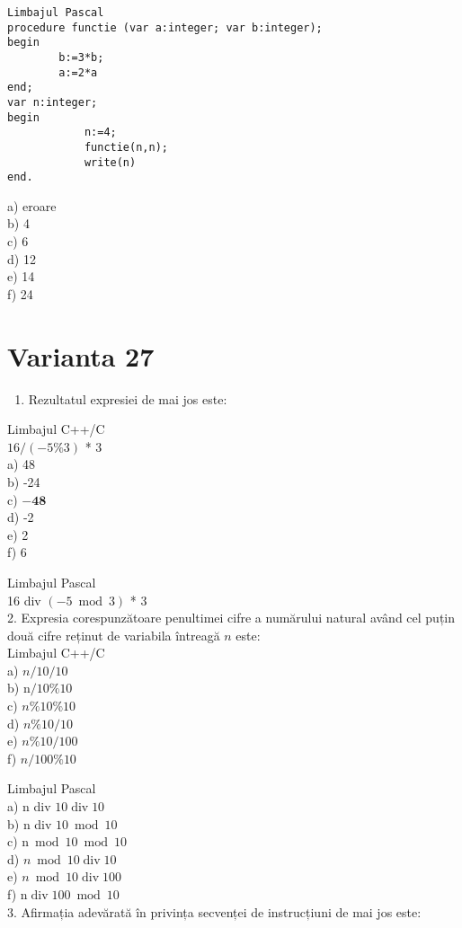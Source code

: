 \begin{verbatim}
Limbajul Pascal
procedure functie (var a:integer; var b:integer);
begin
        b:=3*b;
        a:=2*a
end;
var n:integer;
begin
            n:=4;
            functie(n,n);
            write(n)
end.
\end{verbatim}

a) eroare\\
b) 4\\
c) 6\\
d) 12\\
e) 14\\
f) 24

\section*{Varianta 27}
\begin{enumerate}
  \item Rezultatul expresiei de mai jos este:
\end{enumerate}

Limbajul C++/C\\
$16 /(-5 \% 3)$ * 3\\
a) 48\\
b) -24\\
c) $\mathbf{- 4 8}$\\
d) -2\\
e) 2\\
f) 6

Limbajul Pascal\\
16 div $(-5 \bmod 3)$ * 3\\
2. Expresia corespunzătoare penultimei cifre a numărului natural având cel puțin două cifre reținut de variabila întreagă $n$ este:\\
Limbajul C++/C\\
a) $n / 10 / 10$\\
b) $\mathrm{n} / 10 \% 10$\\
c) $n \% 10 \% 10$\\
d) $n \% 10 / 10$\\
e) $n \% 10 / 100$\\
f) $n / 100 \% 10$

Limbajul Pascal\\
a) n div $10 \operatorname{div} 10$\\
b) n div $10 \bmod 10$\\
c) $\mathrm{n} \bmod 10 \bmod 10$\\
d) $n \bmod 10 \operatorname{div} 10$\\
e) $n \bmod 10 \operatorname{div} 100$\\
f) $\mathrm{n} \operatorname{div} 100 \bmod 10$\\
3. Afirmația adevărată în privința secvenței de instrucțiuni de mai jos este:

